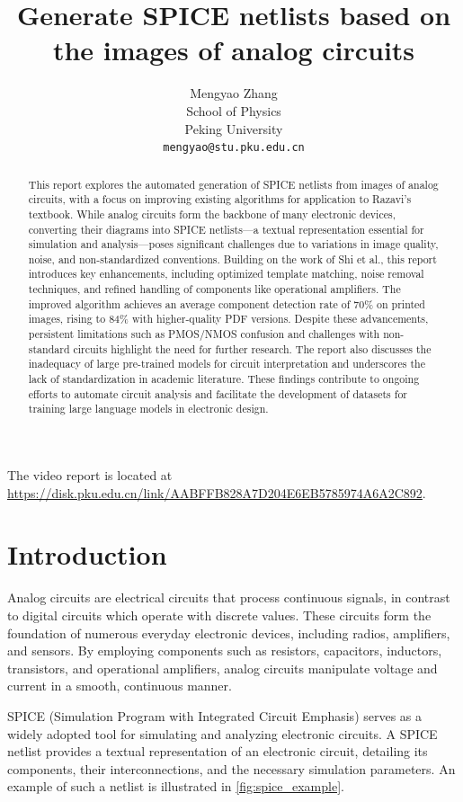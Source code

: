 \documentclass{article}
\title{Generate SPICE netlists based on the images of analog circuits}
\author{%
  Mengyao Zhang\\ %
  School of Physics\\
  Peking University\\
  \texttt{mengyao@stu.pku.edu.cn} \\
}
\begin{document}
\maketitle

The video report is located at \url{https://disk.pku.edu.cn/link/AABFFB828A7D204E6EB5785974A6A2C892}. 

\begin{abstract}
This report explores the automated generation of SPICE netlists from images of analog circuits, with a focus on improving existing algorithms for application to Razavi's textbook. 
While analog circuits form the backbone of many electronic devices, converting their diagrams into SPICE netlists—a textual representation essential for simulation and analysis—poses significant challenges due to variations in image quality, noise, and non-standardized conventions. 
Building on the work of Shi et al., this report introduces key enhancements, including optimized template matching, noise removal techniques, and refined handling of components like operational amplifiers. 
The improved algorithm achieves an average component detection rate of 70\% on printed images, rising to 84\% with higher-quality PDF versions. 
Despite these advancements, persistent limitations such as PMOS/NMOS confusion and challenges with non-standard circuits highlight the need for further research. 
The report also discusses the inadequacy of large pre-trained models for circuit interpretation and underscores the lack of standardization in academic literature. 
These findings contribute to ongoing efforts to automate circuit analysis and facilitate the development of datasets for training large language models in electronic design.
\end{abstract}

\section{Introduction}\label{sec:introduction}

Analog circuits are electrical circuits that process continuous signals, in contrast to digital circuits which operate with discrete values. 
These circuits form the foundation of numerous everyday electronic devices, including radios, amplifiers, and sensors. 
By employing components such as resistors, capacitors, inductors, transistors, and operational amplifiers, analog circuits manipulate voltage and current in a smooth, continuous manner.

SPICE (Simulation Program with Integrated Circuit Emphasis) serves as a widely adopted tool for simulating and analyzing electronic circuits. 
A SPICE netlist provides a textual representation of an electronic circuit, detailing its components, their interconnections, and the necessary simulation parameters. 
An example of such a netlist is illustrated in \cref{fig:spice_example}.
\end{document}
